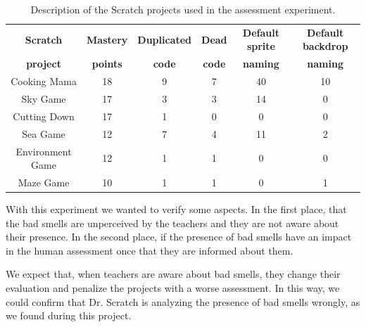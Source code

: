 \begin{table}
    \centering
    \begin{tabular}{|c|c|c|c|c|c|}
        \hline
        \textbf{Scratch} & \textbf{Mastery} & \textbf{Duplicated} & \textbf{Dead} & \textbf{Default sprite} & \textbf{Default backdrop} \\
        \textbf{project} & \textbf{points} & \textbf{code} & \textbf{code} & \textbf{naming} & \textbf{naming} \\ \hline
        Cooking Mama & 18 & 9 & 7 & 40 & 10 \\ \hline
        Sky Game & 17 & 3 & 3 & 14 & 0 \\ \hline
        Cutting Down & 17 & 1 & 0 & 0 & 0 \\ \hline
        Sea Game & 12 & 7 & 4 & 11 & 2 \\ \hline
        Environment Game & 12 & 1 & 1 & 0 & 0 \\ \hline
        Maze Game & 10 & 1 & 1 & 0 & 1 \\ \hline
    \end{tabular}
    \caption{Description of the Scratch projects used in the assessment experiment.}
    \label{table:scratch_projects_experiment}
\end{table}

With this experiment we wanted to verify some aspects. In the first place, that the bad smells are unperceived by the teachers and they are not aware about their presence. In the second place, if the presence of bad smells have an impact in the human assessment once that they are informed about them.

We expect that, when teachers are aware about bad smells, they change their evaluation and penalize the projects with a worse assessment. In this way, we could confirm that Dr. Scratch is analyzing the presence of bad smells wrongly, as we found during this project. 
